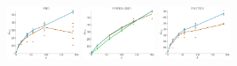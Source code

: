 \documentclass[a4paper]{report}
\newcommand{\wratio}{0.16}
\begin{document}
\vfill
\includegraphics[width=\wratio\textwidth]{maxcut/PHD/fs_phd}\hfill
\includegraphics[width=\wratio\textwidth]{maxcut/POWER_GRID/fs_power_grid}\hfill
\includegraphics[width=\wratio\textwidth]{maxcut/PROTEIN/fs_protein}\hfill
\end{document}
